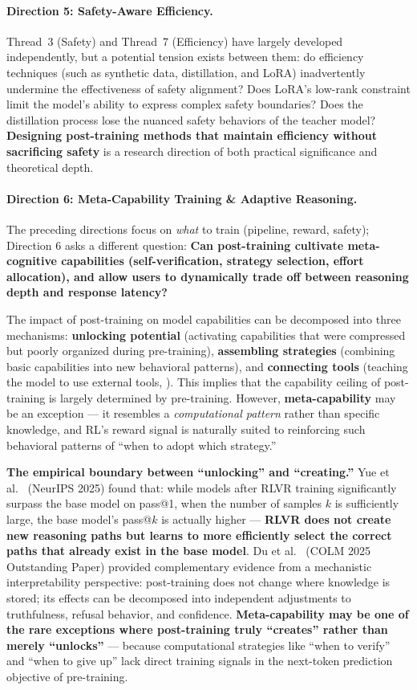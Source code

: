 \paragraph{Direction 5: Safety-Aware Efficiency.}
Thread~3 (Safety) and Thread~7 (Efficiency) have largely developed independently,
but a potential tension exists between them:
do efficiency techniques (such as synthetic data, distillation, and LoRA)
inadvertently undermine the effectiveness of safety alignment?
Does LoRA's low-rank constraint limit the model's ability to express complex safety boundaries?
Does the distillation process lose the nuanced safety behaviors of the teacher model?
\textbf{Designing post-training methods that maintain efficiency without sacrificing safety}
is a research direction of both practical significance and theoretical depth.

\paragraph{Direction 6: Meta-Capability Training \& Adaptive Reasoning.}
The preceding directions focus on \textit{what} to train (pipeline, reward, safety);
Direction 6 asks a different question:
\textbf{Can post-training cultivate meta-cognitive capabilities
(self-verification, strategy selection, effort allocation),
and allow users to dynamically trade off between reasoning depth and response latency?}

The impact of post-training on model capabilities can be decomposed into three mechanisms:
\textbf{unlocking potential} (activating capabilities that were compressed but poorly organized during pre-training),
\textbf{assembling strategies} (combining basic capabilities into new behavioral patterns), and
\textbf{connecting tools} (teaching the model to use external tools, ).
This implies that the capability ceiling of post-training is largely determined by pre-training.
However, \textbf{meta-capability} may be an exception ---
it resembles a \textit{computational pattern} rather than specific knowledge,
and RL's reward signal is naturally suited to reinforcing such behavioral patterns of ``when to adopt which strategy.''

\noindent
\textbf{The empirical boundary between ``unlocking'' and ``creating.''}
Yue et al.\ \cite{yue2025rlvr} (NeurIPS 2025) found that:
while models after RLVR training significantly surpass the base model on pass@1,
when the number of samples $k$ is sufficiently large, the base model's pass@$k$ is actually higher ---
\textbf{RLVR does not create new reasoning paths
but learns to more efficiently select the correct paths that already exist in the base model}.
Du et al.\ \cite{du2025reshaping} (COLM 2025 Outstanding Paper)
provided complementary evidence from a mechanistic interpretability perspective:
post-training does not change where knowledge is stored;
its effects can be decomposed into independent adjustments to truthfulness, refusal behavior, and confidence.
\textbf{Meta-capability may be one of the rare exceptions where post-training truly ``creates''
rather than merely ``unlocks''} ---
because computational strategies like ``when to verify'' and ``when to give up''
lack direct training signals in the next-token prediction objective of pre-training.

